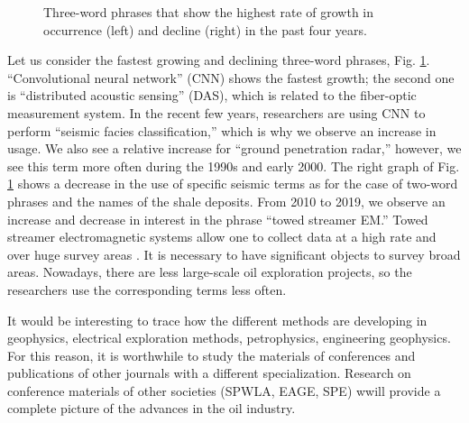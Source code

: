 \documentclass[geosciences,article,submit,moreauthors,pdftex]{Definitions/mdpi}
\begin{document}
\begin{figure}[ht!]


\caption{Three-word phrases that show the highest rate of growth in occurrence (left) and decline (right) in the past four years.}
\label{trigrams}
\end{figure}

Let us consider the fastest growing and declining three-word phrases, Fig. \ref{trigrams}. ``Convolutional neural network'' (CNN) shows the fastest growth; the second one is ``distributed acoustic sensing'' (DAS), which is related to the fiber-optic measurement system. In the recent few years, researchers are using CNN to perform ``seismic facies classification,'' which is why we observe an increase in usage. We also see a relative increase for ``ground penetration radar,'' however, we see this term more often during the 1990s and early 2000. The right graph of Fig. \ref{trigrams} shows a decrease in the use of specific seismic terms as for the case of two-word phrases and the names of the shale deposits. From 2010 to 2019, we observe an increase and decrease in interest in the phrase ``towed streamer EM.'' Towed streamer electromagnetic systems allow one to collect data at a high rate and over huge survey areas \citep{Zhdanov2015}. It is necessary to have significant objects to survey broad areas. Nowadays, there are less large-scale oil exploration projects, so the researchers use the corresponding terms less often.

It would be interesting to trace how the different methods are developing in geophysics, electrical exploration methods, petrophysics, engineering geophysics. For this reason, it is worthwhile to study the materials of conferences and publications of other journals with a different specialization. Research on conference materials of other societies (SPWLA, EAGE, SPE) wwill provide a complete picture of the advances in the oil industry.
\end{document}
